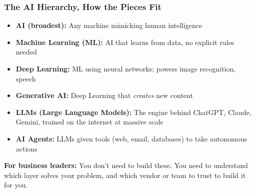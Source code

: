 
 


\begin{frame}[fragile]\frametitle{The AI Hierarchy, How the Pieces Fit}

\begin{itemize}
  \item \textbf{AI (broadest):} Any machine mimicking human intelligence
  \item \textbf{Machine Learning (ML):} AI that learns from data, no explicit rules needed
  \item \textbf{Deep Learning:} ML using neural networks; powers image recognition, speech
  \item \textbf{Generative AI:} Deep Learning that \textit{creates} new content
  \item \textbf{LLMs (Large Language Models):} The engine behind ChatGPT, Claude, Gemini, trained on the internet at massive scale
  \item \textbf{AI Agents:} LLMs given tools (web, email, databases) to take autonomous actions
\end{itemize}

\vspace{0.3em}
\textbf{For business leaders:} You don't need to build these. You need to understand which layer solves your problem, and which vendor or team to trust to build it for you.

\end{frame}

